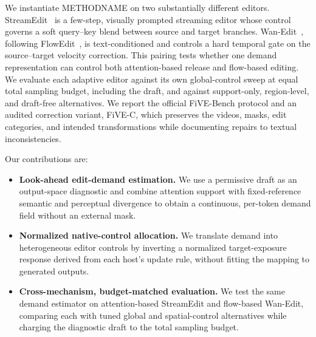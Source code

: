 We instantiate METHODNAME on two substantially different editors.
StreamEdit~\cite{streamedit2026} is a few-step, visually prompted streaming
editor whose control governs a soft query--key blend between source and target
branches. Wan-Edit~\cite{five2025}, following FlowEdit~\cite{flowedit}, is
text-conditioned and controls a hard temporal gate on the source--target
velocity correction. This pairing tests whether one demand representation can
control both attention-based release and flow-based editing. We evaluate each
adaptive editor against its own global-control sweep at equal total sampling
budget, including the draft, and against support-only, region-level, and
draft-free alternatives. We report the official FiVE-Bench protocol and an
audited correction variant, FiVE-C, which preserves the videos, masks, edit
categories, and intended transformations while documenting repairs to textual
inconsistencies.

Our contributions are:
\begin{itemize}
    \item \textbf{Look-ahead edit-demand estimation.} We use a permissive draft
    as an output-space diagnostic and combine attention support with
    fixed-reference semantic and perceptual divergence to obtain a continuous,
    per-token demand field without an external mask.

    \item \textbf{Normalized native-control allocation.} We translate demand
    into heterogeneous editor controls by inverting a normalized
    target-exposure response derived from each host's update rule, without
    fitting the mapping to generated outputs.

    \item \textbf{Cross-mechanism, budget-matched evaluation.} We test the same
    demand estimator on attention-based StreamEdit and flow-based Wan-Edit,
    comparing each with tuned global and spatial-control alternatives while
    charging the diagnostic draft to the total sampling budget.
\end{itemize}
